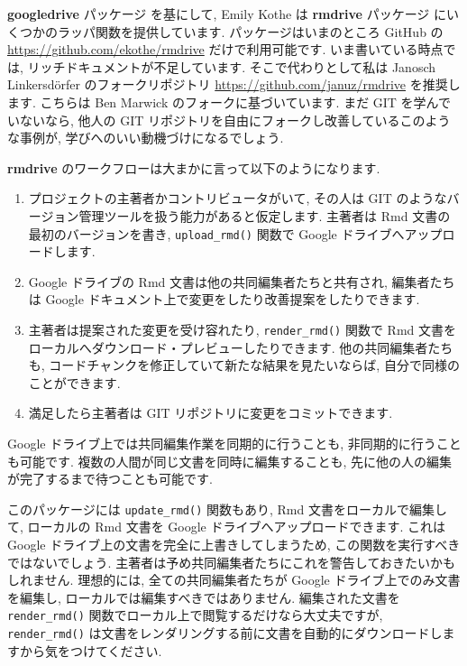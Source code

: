 \documentclass[
  11pt,
  lualatex,
  ja=standard]{bxjsreport}
\begin{document}
\textbf{googledrive} パッケージ \autocite{R-googledrive} を基にして, Emily Kothe は \textbf{rmdrive} パッケージ にいくつかのラッパ関数を提供しています. パッケージはいまのところ GitHub の \url{https://github.com/ekothe/rmdrive} だけで利用可能です. いま書いている時点では, リッチドキュメントが不足しています. そこで代わりとして私は Janosch Linkersdörfer のフォークリポジトリ \url{https://github.com/januz/rmdrive} を推奨します. こちらは Ben Marwick のフォークに基づいています. まだ GIT を学んでいないなら, 他人の GIT リポジトリを自由にフォークし改善しているこのような事例が, 学びへのいい動機づけになるでしょう.

\textbf{rmdrive} のワークフローは大まかに言って以下のようになります.

\begin{enumerate}
\def\labelenumi{\arabic{enumi}.}
\item
  プロジェクトの主著者かコントリビュータがいて, その人は GIT のようなバージョン管理ツールを扱う能力があると仮定します. 主著者は Rmd 文書の最初のバージョンを書き, \texttt{upload\_rmd()} 関数で Google ドライブへアップロードします.
\item
  Google ドライブの Rmd 文書は他の共同編集者たちと共有され, 編集者たちは Google ドキュメント上で変更をしたり改善提案をしたりできます.
\item
  主著者は提案された変更を受け容れたり, \texttt{render\_rmd()} 関数で Rmd 文書をローカルへダウンロード・プレビューしたりできます. 他の共同編集者たちも, コードチャンクを修正していて新たな結果を見たいならば, 自分で同様のことができます.
\item
  満足したら主著者は GIT リポジトリに変更をコミットできます.
\end{enumerate}

Google ドライブ上では共同編集作業を同期的に行うことも, 非同期的に行うことも可能です. 複数の人間が同じ文書を同時に編集することも, 先に他の人の編集が完了するまで待つことも可能です.

このパッケージには \texttt{update\_rmd()} 関数もあり, Rmd 文書をローカルで編集して, ローカルの Rmd 文書を Google ドライブへアップロードできます. これは Google ドライブ上の文書を完全に上書きしてしまうため, この関数を実行すべきではないでしょう. 主著者は予め共同編集者たちにこれを警告しておきたいかもしれません. 理想的には, 全ての共同編集者たちが Google ドライブ上でのみ文書を編集し, ローカルでは編集すべきではありません. 編集された文書を \texttt{render\_rmd()} 関数でローカル上で閲覧するだけなら大丈夫ですが, \texttt{render\_rmd()} は文書をレンダリングする前に文書を自動的にダウンロードしますから気をつけてください.
\end{document}
